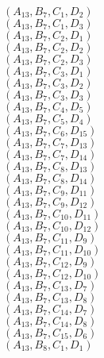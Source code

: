 \documentclass[14pt]{article}
\begin{document}
    $({A}_{13}, {B}_{7}, {C}_{1}, {D}_{2}) $ \\ 
    $({A}_{13}, {B}_{7}, {C}_{1}, {D}_{3}) $ \\ 
    $({A}_{13}, {B}_{7}, {C}_{2}, {D}_{1}) $ \\ 
    $({A}_{13}, {B}_{7}, {C}_{2}, {D}_{2}) $ \\ 
    $({A}_{13}, {B}_{7}, {C}_{2}, {D}_{3}) $ \\ 
    $({A}_{13}, {B}_{7}, {C}_{3}, {D}_{1}) $ \\ 
    $({A}_{13}, {B}_{7}, {C}_{3}, {D}_{2}) $ \\ 
    $({A}_{13}, {B}_{7}, {C}_{3}, {D}_{3}) $ \\ 
    $({A}_{13}, {B}_{7}, {C}_{4}, {D}_{5}) $ \\ 
    $({A}_{13}, {B}_{7}, {C}_{5}, {D}_{4}) $ \\ 
    $({A}_{13}, {B}_{7}, {C}_{6}, {D}_{15}) $ \\ 
    $({A}_{13}, {B}_{7}, {C}_{7}, {D}_{13}) $ \\ 
    $({A}_{13}, {B}_{7}, {C}_{7}, {D}_{14}) $ \\ 
    $({A}_{13}, {B}_{7}, {C}_{8}, {D}_{13}) $ \\ 
    $({A}_{13}, {B}_{7}, {C}_{8}, {D}_{14}) $ \\ 
    $({A}_{13}, {B}_{7}, {C}_{9}, {D}_{11}) $ \\ 
    $({A}_{13}, {B}_{7}, {C}_{9}, {D}_{12}) $ \\ 
    $({A}_{13}, {B}_{7}, {C}_{10}, {D}_{11}) $ \\ 
    $({A}_{13}, {B}_{7}, {C}_{10}, {D}_{12}) $ \\ 
    $({A}_{13}, {B}_{7}, {C}_{11}, {D}_{9}) $ \\ 
    $({A}_{13}, {B}_{7}, {C}_{11}, {D}_{10}) $ \\ 
    $({A}_{13}, {B}_{7}, {C}_{12}, {D}_{9}) $ \\ 
    $({A}_{13}, {B}_{7}, {C}_{12}, {D}_{10}) $ \\ 
    $({A}_{13}, {B}_{7}, {C}_{13}, {D}_{7}) $ \\ 
    $({A}_{13}, {B}_{7}, {C}_{13}, {D}_{8}) $ \\ 
    $({A}_{13}, {B}_{7}, {C}_{14}, {D}_{7}) $ \\ 
    $({A}_{13}, {B}_{7}, {C}_{14}, {D}_{8}) $ \\ 
    $({A}_{13}, {B}_{7}, {C}_{15}, {D}_{6}) $ \\ 
    $({A}_{13}, {B}_{8}, {C}_{1}, {D}_{1}) $ \\ 
\end{document}
